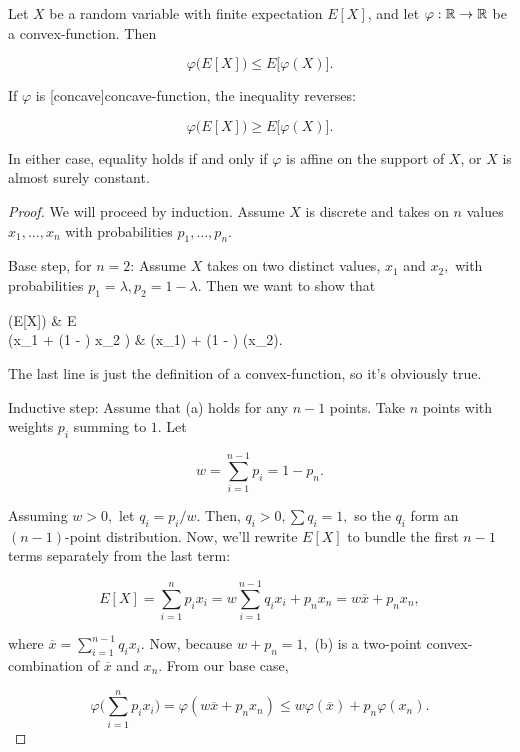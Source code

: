 \documentclass{article}
\begin{document}
\begin{theorem}\label{jensens-inequality}
Let $X$ be a \@{random variable} with finite \@{expectation} $E[X]$, and let $\varphi : \mathbb{R} \to \mathbb{R}$ be
a \@{convex-function}. Then

\[ \varphi\big(E[X]\big) \leq E\big[\varphi(X)\big]. \tag{a} \]

If $\varphi$ is \@[concave]{concave-function}, the inequality reverses:

\[ \varphi\big(E[X]\big) \geq E\big[\varphi(X)\big]. \]

In either case, equality holds if and only if $\varphi$ is \@{affine} on the support of $X$, or $X$ is almost surely constant.
\end{theorem}

\begin{proof}
We will proceed by induction. Assume $X$ is discrete and takes on $n$ values $x_1, \dots, x_n$ with \@{probabilities} $p_1, \dots, p_n.$

Base step, for $n=2$: Assume $X$ takes on two distinct values, $x_1$ and $x_2,$ with probabilities $p_1 = \lambda, p_2 = 1 - \lambda.$ Then we want to show that

\bal
\varphi\big(E[X]\big) & \leq E \\
\varphi\big(\lambda x_1 + (1 - \lambda) x_2 \big) & \leq \lambda \varphi(x_1) + (1 - \lambda) \varphi(x_2). \\
\eal

The last line is just the definition of a \@{convex-function}, so it's obviously true.

Inductive step: Assume that (a) holds for any $n - 1$ points. Take $n$ points with weights $p_i$ summing to $1.$ Let

\[ w = \sum_{i=1}^{n-1} p_i = 1 - p_n. \]

Assuming $w > 0,$ let $q_i = p_i / w.$ Then, $q_i > 0, \sum q_i = 1,$ so the $q_i$ form an $(n-1)$-point distribution. Now, we'll rewrite $E[X]$ to bundle the first $n-1$ terms separately from the last term:

\[ E[X] = \sum_{i=1}^{n} p_i x_i = w \sum_{i=1}^{n-1} q_i x_i + p_n x_n = w \overline{x} + p_n x_n, \tag{b} \]

where $\overline{x} =  \sum_{i=1}^{n-1} q_i x_i.$ Now, because $w + p_n = 1,$ (b) is a two-point \@{convex-combination} of $\overline{x}$ and $x_n.$ From our base case,

\[ \varphi \big ( \sum_{i=1}^{n} p_i x_i \big ) = \varphi(w \overline{x} + p_n x_n) \leq w\varphi(\overline{x}) + p_n\varphi(x_n). \]


\end{proof}
\end{document}
